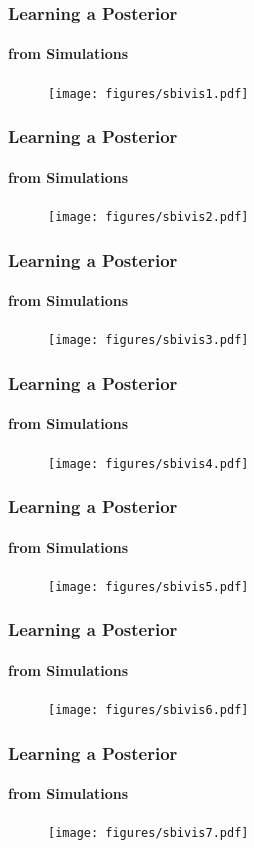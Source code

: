 \documentclass[9pt]{beamer}
\begin{document}
\begin{frame}
\frametitle{Learning a Posterior}
\framesubtitle{from Simulations}
\begin{figure}
	\texttt{[image: figures/sbivis1.pdf]}
\end{figure}
\end{frame} 
\begin{frame}
\frametitle{Learning a Posterior}
\framesubtitle{from Simulations}
\begin{figure}
	\texttt{[image: figures/sbivis2.pdf]}
\end{figure}
\end{frame} \begin{frame}
\frametitle{Learning a Posterior}
\framesubtitle{from Simulations}
\begin{figure}
\texttt{[image: figures/sbivis3.pdf]}
\end{figure}
\end{frame} \begin{frame}
\frametitle{Learning a Posterior}
\framesubtitle{from Simulations}
\begin{figure}
\texttt{[image: figures/sbivis4.pdf]}
\end{figure}
\end{frame} \begin{frame}
\frametitle{Learning a Posterior}
\framesubtitle{from Simulations}
\begin{figure}
\texttt{[image: figures/sbivis5.pdf]}
\end{figure}
\end{frame} \begin{frame}
\frametitle{Learning a Posterior}
\framesubtitle{from Simulations}
\begin{figure}
\texttt{[image: figures/sbivis6.pdf]}
\end{figure}
\end{frame} \begin{frame}
\frametitle{Learning a Posterior}
\framesubtitle{from Simulations}
\begin{figure}
\texttt{[image: figures/sbivis7.pdf]}
\end{figure}
\end{frame} 

\end{document}

